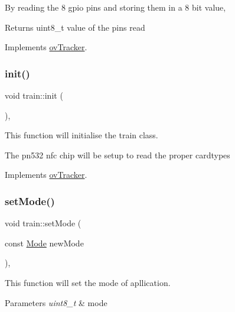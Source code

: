 By reading the 8 gpio pins and storing them in a 8 bit value, \begin{DoxyReturn}{Returns}
uint8\+\_\+t value of the pins read 
\end{DoxyReturn}


Implements \hyperlink{classovTracker_afda6f161dc45106e43fc5031916fd91a}{ov\+Tracker}.

\mbox{\label{classtrain_a52db26884bf0f979ad55ce92f3d2f159}} 
\subsubsection{\texorpdfstring{init()}{init()}}
{\footnotesize\ttfamily void train\+::init (\begin{DoxyParamCaption}{ }\end{DoxyParamCaption})\hspace{0.3cm}{\ttfamily [override]}, {\ttfamily [virtual]}}



This function will initialise the train class. 

The pn532 nfc chip will be setup to read the proper cardtypes 

Implements \hyperlink{classovTracker_aa12f6c32a67e9a00d4b733963c54b443}{ov\+Tracker}.

\mbox{\label{classtrain_ae4cd3a06c0b736f2de38dd7987e9576e}} 
\subsubsection{\texorpdfstring{set\+Mode()}{setMode()}}
{\footnotesize\ttfamily void train\+::set\+Mode (\begin{DoxyParamCaption}\item[{const \hyperlink{stations_8h_ad03936209251465257e0fdcfb33dbf91}{Mode}}]{new\+Mode }\end{DoxyParamCaption})\hspace{0.3cm}{\ttfamily [override]}, {\ttfamily [virtual]}}



This function will set the mode of apllication. 


\begin{DoxyParams}{Parameters}
{\em uint8\+\_\+t} & mode \\
\hline
\end{DoxyParams}


